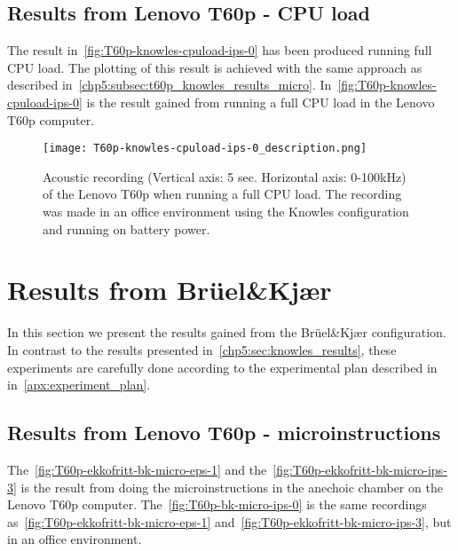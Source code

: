 \subsection{Results from Lenovo T60p - CPU load}\label{chp5:subsec:t60p_knowles_results_cpuload}
The result in~\autoref{fig:T60p-knowles-cpuload-ips-0} has been produced running full CPU load. The plotting of this result is achieved with the same approach as described in~\autoref{chp5:subsec:t60p_knowles_results_micro}. 
In~\autoref{fig:T60p-knowles-cpuload-ips-0} is the result gained from running a full CPU load in the Lenovo T60p computer. 
\begin{figure}[ht]
    \centering
    \texttt{[image: T60p-knowles-cpuload-ips-0\_description.png]}
    \caption{Acoustic recording (Vertical axis: 5 sec. Horizontal axis: 0-100kHz) of the Lenovo T60p when running a full CPU load. The recording was made in an office environment using the Knowles configuration and running on battery power. }
    \label{fig:T60p-knowles-cpuload-ips-0}
\end{figure}

\section{Results from Brüel\&Kjær}\label{chp5:sec:bk_results}
In this section we present the results gained from the Brüel\&Kjær configuration. 
In contrast to the results presented in~\autoref{chp5:sec:knowles_results}, these experiments are carefully done according to the experimental plan described in in~\autoref{apx:experiment_plan}. 

\subsection{Results from Lenovo T60p - microinstructions}\label{chp5:subsec:t60p_bk_results_micro}
The~\autoref{fig:T60p-ekkofritt-bk-micro-eps-1} and the~\autoref{fig:T60p-ekkofritt-bk-micro-ips-3} is the result from doing the microinstructions in the anechoic chamber on the Lenovo T60p computer. The~\autoref{fig:T60p-bk-micro-ips-0} is the same recordings as~\autoref{fig:T60p-ekkofritt-bk-micro-eps-1} and~\autoref{fig:T60p-ekkofritt-bk-micro-ips-3}, but in an office environment.

